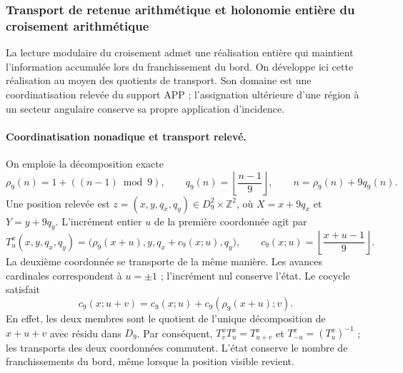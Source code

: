 \subsubsection{Transport de retenue arithmétique et holonomie entière du croisement arithmétique}
\label{subsec:transporte-entero-cruce}

La lecture modulaire du croisement admet une réalisation entière qui maintient
l’information accumulée lors du franchissement du bord. On développe ici cette
réalisation au moyen des quotients de transport. Son domaine est une coordinatisation
relevée du support APP ; l’assignation ultérieure d’une région à un secteur
angulaire conserve sa propre application d’incidence.

\paragraph{Coordinatisation nonadique et transport relevé.}
On emploie la décomposition exacte
\[
 \rho_9(n)=1+((n-1)\bmod9),\qquad
 q_9(n)=\left\lfloor\frac{n-1}{9}\right\rfloor,
 \qquad n=\rho_9(n)+9q_9(n).
\]
Une position relevée est
$z=(x,y,q_x,q_y)\in D_9^2\times\mathbb Z^2$, où
$X=x+9q_x$ et $Y=y+9q_y$. L'incrément entier $u$ de la première
coordonnée agit par
\[
 T^x_u(x,y,q_x,q_y)=
 \bigl(\rho_9(x+u),y,q_x+c_9(x;u),q_y\bigr),\qquad
 c_9(x;u)=\left\lfloor\frac{x+u-1}{9}\right\rfloor.
\]
La deuxième coordonnée se transporte de la même manière. Les avances
cardinales correspondent à $u=\pm1$ ; l'incrément nul conserve l'état.
Le cocycle satisfait
\[
 c_9(x;u+v)=c_9(x;u)+c_9(\rho_9(x+u);v).
\]
En effet, les deux membres sont le quotient de l'unique décomposition de
$x+u+v$ avec résidu dans $D_9$. Par conséquent,
$T^x_vT^x_u=T^x_{u+v}$ et $T^x_{-u}=(T^x_u)^{-1}$ ; les transports
des deux coordonnées commutent. L'état conserve le nombre de franchissements
du bord, même lorsque la position visible revient.

